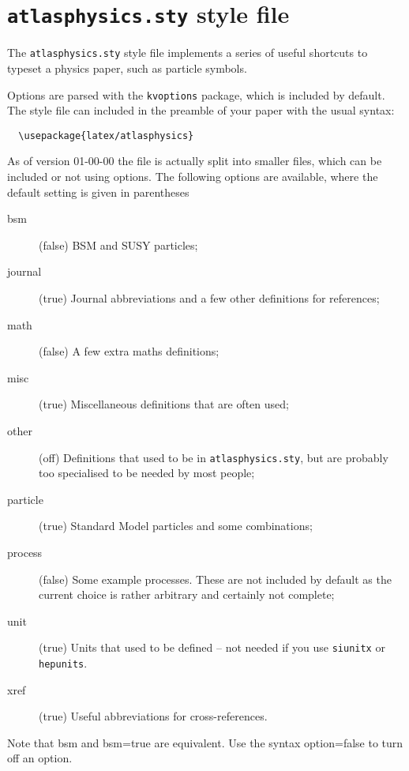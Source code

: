 \documentclass[koma,UKenglish]{latex/atlasdoc}
\author{Ian C. Brock}
\affil{University of Bonn}
\newcommand{\File}[1]{\texttt{#1}\xspace}
\newcommand{\Option}[1]{\textsf{#1}\xspace}
\newcommand{\Package}[1]{\texttt{#1}\xspace}
\begin{document}
\tableofcontents

\section{\File{atlasphysics.sty} style file}
\label{sec:atlasphysics}

The \File{atlasphysics.sty} style file implements a series of useful
shortcuts to typeset a physics paper, such as particle
symbols.

Options are parsed with the \Package{kvoptions} package, which is included by default.
The style file can included in the preamble of your paper with the usual
syntax:
%
\begin{verbatim}
  \usepackage{latex/atlasphysics}
\end{verbatim}
%
As of version 01-00-00 the file is actually split into smaller files,
which can be included or not using options.
The following options are available, where the default setting is given in parentheses
\begin{description}
\item[bsm](false) BSM and SUSY particles;
\item[journal](true) Journal abbreviations and a few other definitions for references;
\item[math](false) A few extra maths definitions;
\item[misc](true) Miscellaneous definitions that are often used;
\item[other](off) Definitions that used to be in \File{atlasphysics.sty}, 
  but are probably too specialised to be needed by most people;
\item[particle](true) Standard Model particles and some combinations;
\item[process](false) Some example processes. 
  These are not included by default as the current choice is rather arbitrary
  and certainly not complete;
\item[unit](true) Units that used to be defined -- not needed if you use \Package{siunitx} or \Package{hepunits}.
\item[xref](true) Useful abbreviations for cross-references.
\end{description}
Note that \Option{bsm} and \Option{bsm=true} are equivalent.
Use the syntax \Option{option=false} to turn off an option.
\end{document}
